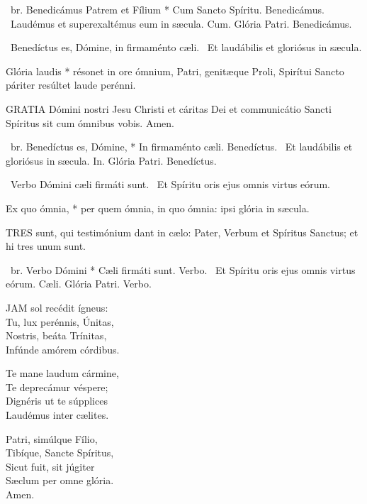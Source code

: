 \R\ br. Benedicámus Patrem et Fílium * Cum Sancto Spíritu. Benedicámus. \V\ Laudémus et superexaltémus eum in sæcula. Cum. Glória Patri. Benedicámus.

\V\ Benedíctus es, Dómine, in firmaménto cæli. \R\ Et laudábilis et gloriósus in sæcula.


 Glória laudis * résonet in ore ómnium, Patri, genitæque Proli, Spirítui Sancto páriter resúltet laude perénni.


\lettrine[lines=2]{G}{RATIA} Dómini nostri Jesu Christi et cáritas Dei et communicátio Sancti Spíritus sit cum ómnibus vobis. Amen.

\R\ br. Benedíctus es, Dómine, * In firmaménto cæli. Benedíctus. \V\ Et laudábilis et gloriósus in sæcula. In. Glória Patri. Benedíctus.

\V\ Verbo Dómini cæli firmáti sunt. \R\ Et Spíritu oris ejus omnis virtus eórum.


 Ex quo ómnia, * per quem ómnia, in quo ómnia: ipsi glória in sæcula.


\lettrine[lines=2]{T}{RES} sunt, qui testimónium dant in cælo: Pater, Verbum et Spíritus Sanctus; et hi tres unum sunt.

\R\ br. Verbo Dómini * Cæli firmáti sunt. Verbo. \V\ Et Spíritu oris ejus omnis virtus eórum. Cæli. Glória Patri. Verbo.




\lettrine[lines=2]{J}{AM} sol recédit ígneus:\\
Tu, lux perénnis, Únitas,\\
Nostris, beáta Trínitas,\\
Infúnde amórem córdibus.

Te mane laudum cármine,\\
Te deprecámur véspere;\\
Dignéris ut te súpplices\\
Laudémus inter cælites.

Patri, simúlque Fílio,\\
Tibíque, Sancte Spíritus,\\
Sicut fuit, sit júgiter\\
Sæclum per omne glória.\\
Amen.

